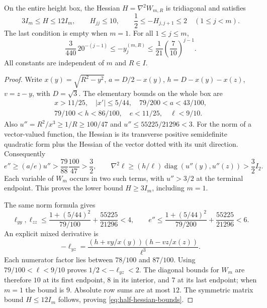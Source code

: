\begin{lemma}
\label{lem:uniform-half-hessian}
On the entire height box, the Hessian $H=\nabla^2 W_{m,R}$ is
tridiagonal and satisfies
\begin{equation}\label{eq:half-hessian-bounds}
 3I_m\le H\le12I_m,\qquad H_{jj}\le10,\qquad
 \frac12\le-H_{j,j+1}\le2\quad(1\le j<m).
\end{equation}
The last condition is empty when $m=1$. For all $1\le j\le m$,
\begin{equation}\label{eq:height-two-sided}
 \frac3{440}\,20^{-(j-1)}
 \le -y^{(m,R)}_j
 \le \frac1{21}\left(\frac7{10}\right)^{j-1}.
\end{equation}
All constants are independent of $m$ and $R\in I$.
\end{lemma}
\begin{proof}
Write $x(y)=\sqrt{R^2-y^2}$, $a=D/2-x(y)$,
$h=D-x(y)-x(z)$, $v=z-y$, with $D=\sqrt3$.
The elementary bounds on the whole box are
\[
 \begin{gathered}
 x>11/25,\quad |x'|\le5/44,\quad79/200<a<43/100,\\
 79/100<h<86/100,\quad e<11/25,\quad\ell<9/10.
 \end{gathered}
\]
Also $u''=R^2/x^3\ge1/R\ge100/47$ and
$u''\le55225/21296<3$. For the norm of a vector-valued function,
the Hessian is its transverse positive semidefinite quadratic form
plus the Hessian of the vector dotted with its unit direction.
Consequently
\[
 e''\ge(a/e)u''>\frac{79}{88}\frac{100}{47}>\frac32,
 \qquad
 \nabla^2\ell\ge(h/\ell)\operatorname{diag}(u''(y),u''(z))
 >\frac32 I_2.
\]
Each variable of $W_m$ occurs in two such terms, with $u''>3/2$
at the terminal endpoint. This proves the lower bound $H\ge3I_m$,
including $m=1$.

The same norm formula gives
\[
 \ell_{yy},\ell_{zz}
 \le\frac{1+(5/44)^2}{79/100}+\frac{55225}{21296}<4,
 \qquad
 e''\le\frac{1+(5/44)^2}{79/200}+\frac{55225}{21296}<6.
\]
An explicit mixed derivative is
\begin{equation}\label{eq:mixed-length-hessian}
 -\ell_{yz}
 =\frac{(h+vy/x(y))(h-vz/x(z))}{\ell^3}.
\end{equation}
Each numerator factor lies between $78/100$ and $87/100$.
Using $79/100<\ell<9/10$ proves $1/2<-\ell_{yz}<2$.
The diagonal bounds for $W_m$ are therefore $10$ at its first
endpoint, $8$ in its interior, and $7$ at its last endpoint; when
$m=1$ the bound is $9$. Absolute row sums are at most $12$.
The symmetric matrix bound $H\le12I_m$ follows, proving
\eqref{eq:half-hessian-bounds}.


\end{proof}
